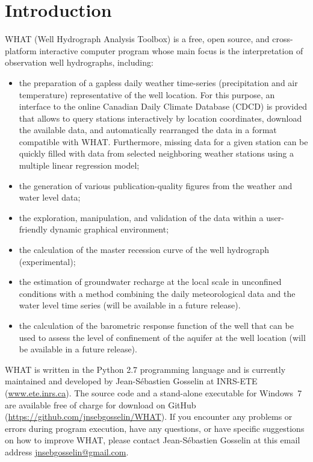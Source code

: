 \documentclass[12pt, letterpaper, fleqn]{report}
\begin{document}
\newpage

\chapter*{Introduction}

WHAT (Well Hydrograph Analysis Toolbox) is a free, open source, and cross-platform interactive computer program whose main focus is the interpretation of observation well hydrographs, including:

\begin{itemize}

\item{the preparation of a gapless daily weather time-series (precipitation and air temperature) representative of the well location. For this purpose, an interface to the online Canadian Daily Climate Database (CDCD) is provided that allows to query stations interactively by location coordinates, download the available data, and automatically rearranged the data in a format compatible with WHAT. Furthermore, missing data for a given station can be quickly filled with data from selected neighboring weather stations using a multiple linear regression model;}

\item{the generation of various publication-quality figures from the weather and water level data;}

\item{the exploration, manipulation, and validation of the data within a user-friendly dynamic graphical environment;}

\item{the calculation of the master recession curve of the well hydrograph (experimental);}

\item{the estimation of groundwater recharge at the local scale in unconfined conditions with a method combining the daily meteorological data and the water level time series (will be available in a future release).}

\item{the calculation of the barometric response function of the well that can be used to assess the level of confinement of the aquifer at the well location (will be available in a future release).}

\end{itemize}

WHAT is written in the Python 2.7 programming language and is currently maintained and developed by Jean-Sébastien Gosselin at INRS-ETE (\url{www.ete.inrs.ca}). The source code and a stand-alone executable for Windows 7 are available free of charge for download on GitHub (\url{https://github.com/jnsebgosselin/WHAT}). If you encounter any problems or errors during program execution, have any questions, or have specific suggestions on how to improve WHAT, please contact Jean-Sébastien Gosselin at this email address \href{mailto:jnsebgosselin@gmail.com}{jnsebgosselin@gmail.com}.
\end{document}
